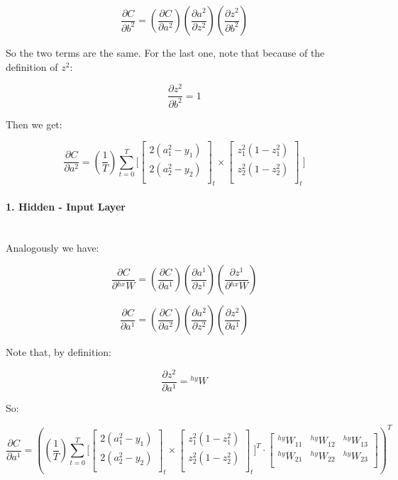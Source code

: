 \documentclass[12pt]{article}
\begin{document}
\begin{equation}
    \dfrac{\partial C}{\partial b^{2}} = \left( \dfrac{\partial C}{\partial a^{2}}\right) \left( \dfrac{\partial a^{2}}{\partial z^{2}}\right) \left(\dfrac{\partial z^{2}}{\partial b^{2}} \right)
\end{equation}

So the two terms are the same. For the last one, note that because of the definition of $z^{2}$:

\[
\dfrac{\partial z^{2}}{\partial b^{2}} = 1
\]

Then we get:


\[
\dfrac{\partial C}{\partial a^{2}} 
=
(\dfrac{1}{T}) \sum_{t=0}^{T} 
\Bigg[
\begin{bmatrix}
2(a_{1}^{2} - y_{1})\\
2(a_{2}^{2} - y_{2})\\
\end{bmatrix}_{t}
\times
\begin{bmatrix}
z_{1}^{2}(1 - z_{1}^{2})\\
z_{2}^{2}(1 - z_{2}^{2})\\
\end{bmatrix}_{t}
\Bigg]
\]


\paragraph{1. Hidden - Input Layer} \mbox{} \\

Analogously we have:

\begin{equation}
    \dfrac{\partial C}{\partial {}^{hx}W} = \left( \dfrac{\partial C}{\partial a^{1}}\right) \left( \dfrac{\partial a^{1}}{\partial z^{1}}\right) \left(\dfrac{\partial z^{1}}{\partial {}^{hx}W} \right)
    \label{whx}
\end{equation}

\[
\dfrac{\partial C}{\partial a^{1}}
=
\left(\dfrac{\partial C}{\partial a^{2}}\right)
\left(\dfrac{\partial a^{2}}{\partial z^{2}}\right)
\left(\dfrac{\partial z^{2}}{\partial a^{1}}\right)
\]

Note that, by definition:

\[
\dfrac{\partial z^{2}}{\partial a^{1}} = {}^{hy}W
\]

So:

\[
\dfrac{\partial C}{\partial a^{1}}
=
\left(
(\dfrac{1}{T}) \sum_{t=0}^{T} 
\Bigg[
\begin{bmatrix}
2(a_{1}^{2} - y_{1})\\
2(a_{2}^{2} - y_{2})\\
\end{bmatrix}_{t}
\times
\begin{bmatrix}
z_{1}^{2}(1 - z_{1}^{2})\\
z_{2}^{2}(1 - z_{2}^{2})\\
\end{bmatrix}_{t}
\Bigg]^{T}
\cdot
\begin{bmatrix}
{}^{hy}W_{11} & {}^{hy}W_{12} & {}^{hy}W_{13} \\
{}^{hy}W_{21} & {}^{hy}W_{22} & {}^{hy}W_{23} \\ 
\end{bmatrix}
\right)^{T}
\]
\end{document}
